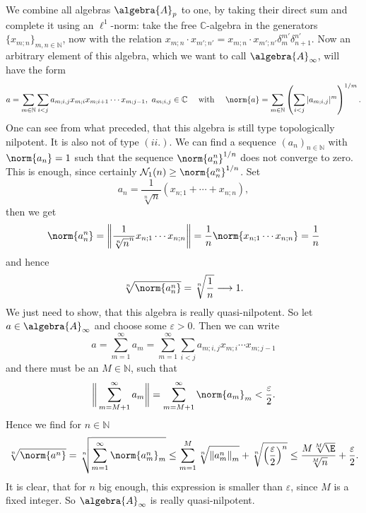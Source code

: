 \documentclass[
11pt,                          %
english                        %
]{article}
\begin{document}
We combine all algebras $\algebra{A}_p$ to one, by taking their direct sum and 
complete it using an $\ell^1$-norm: take the free $\mathbb{C}$-algebra in the 
generators $\{x_{m;n}\}_{m,n \in \mathbb{N}}$, now with the relation $x_{m;n} \cdot 
x_{m';n'} = x_{m;n} \cdot x_{m';n'} \delta_m^{m'} \delta_{n+1}^{n'}$. Now an 
arbitrary element of this algebra, which we want to call $\algebra{A}_\infty$, will 
have the form
\begin{equation*}
	a =
	\sum\limits_{m \in \mathbb{N}}
	\sum\limits_{i < j}
	a_{m; i, j} x_{m; i} x_{m; i + 1} \cdots x_{m; j - 1}
	, \
	a_{m; i,j} \in \mathbb{C}
	\quad \text{ with } \quad
	\norm{a}
	=
	\sum\limits_{m \in \mathbb{N}}
	\left(
		\sum\limits_{i < j}
		|a_{m; i, j}|^m
	\right)^{1/m}.
\end{equation*}
One can see from what preceded, that this algebra is still type topologically 
nilpotent. It is also not of type $(ii.)$. We can find a sequence $(a_n)_{n \in 
\mathbb{N}}$ with $\norm{ a_n } = 1$ such that the sequence $\norm{a_n^n}^{1/n}$ 
does not converge to zero. This is enough, since certainly $\mathcal{N}_1(n) \geq 
\norm{a_n^n}^{1/n}$. Set
\begin{equation*}
	a_n
	=
	\frac{1}{\sqrt[n]{n}}
	(x_{n;1} + \cdots + x_{n;n}),
\end{equation*}
then we get
\begin{equation*}
	\norm{a_n^n}
	=
	\left\Vert
		\frac{1}{\sqrt[n]{n}^n}
		x_{n; 1} \cdots x_{n; n}
	\right\Vert
	=
	\frac{1}{n}
	\norm{ x_{n; 1} \cdots x_{n; n} }
	=
	\frac{1}{n}
\end{equation*}
and hence
\begin{equation*}
	\sqrt[n]{ \norm{a_n^n} }
	=
	\sqrt[n]{\frac{1}{n}}
	\longrightarrow
	1.
\end{equation*}
We just need to show, that this algebra is really quasi-nilpotent. So let 
$a \in \algebra{A}_\infty$ and choose some $\varepsilon > 0$. Then we can write 
\begin{equation*}
	a 
	=
	\sum\limits_{m=1}^\infty
	a_m
	=
	\sum\limits_{m=1}^\infty
	\sum\limits_{i < j}
	a_{m; i, j} x_{m; i} \cdots x_{m; j - 1}	
\end{equation*}
and there must be an $M \in \mathbb{N}$, such that
\begin{equation*}
	\bigg\Vert
		\sum\limits_{m = M+1}^\infty
		a_m
	\bigg\Vert
	=
	\sum\limits_{m = M + 1}^\infty
	\norm{a_m}_m
	<
	\frac{\varepsilon}{2}.
\end{equation*}
Hence we find for $n \in \mathbb{N}$
\begin{equation*}
	\sqrt[n]{\norm{a^n}}
	=
	\sqrt[n]{
		\sum\limits_{m=1}^\infty
		\norm{a_m^n}_m
	}
	\leq
	\sum\limits_{m = 1}^M
	\sqrt[n]{
		\left\Vert a_m^n \right\Vert_m
	}
	+
	\sqrt[n]{ \left( \frac{\varepsilon}{2} \right)^n }
	\leq
	\frac{M \sqrt[M]{\E}}
	{\sqrt[M]{n}}
	+ \frac{\varepsilon}{2}.
\end{equation*}
It is clear, that for $n$ big enough, this expression is smaller than $\varepsilon$, 
since $M$ is a fixed integer. So $\algebra{A}_\infty$ is really quasi-nilpotent.
\end{document}
